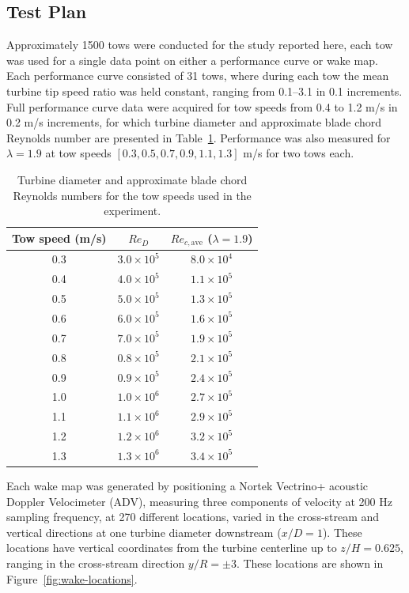 \documentclass[energies,article,accept,moreauthors,pdftex,12pt,a4paper]{mdpi}
\begin{document}
\subsection{Test Plan}

Approximately 1500 tows were conducted for the study reported here, each tow was
used for a single data point on either a performance curve or wake map. Each
performance curve consisted of 31 tows, where during each tow the mean turbine
tip speed ratio was held constant, ranging from 0.1--3.1 in 0.1 increments. Full
performance curve data were acquired for tow speeds from 0.4 to 1.2 m/s in 0.2
m/s increments, for which turbine diameter and approximate blade chord Reynolds
number are presented in Table~\ref{tab:Re}. Performance was also measured for
$\lambda=1.9$ at tow speeds $[0.3, 0.5, 0.7, 0.9, 1.1, 1.3]$ m/s for two tows
each.

\begin{table}
\centering
\begin{tabular}{ccc}
Tow speed (m/s) & $Re_D$ & $Re_{c,\mathrm{ave}}$ ($\lambda = 1.9$) \\
\hline
0.3 & $3.0 \times 10^5$ & $8.0 \times 10^4$ \\
0.4 & $4.0 \times 10^5$ & $1.1 \times 10^5$ \\
0.5 & $5.0 \times 10^5$ & $1.3 \times 10^5$ \\
0.6 & $6.0 \times 10^5$ & $1.6 \times 10^5$ \\
0.7 & $7.0 \times 10^5$ & $1.9 \times 10^5$ \\
0.8 & $0.8 \times 10^5$ & $2.1 \times 10^5$ \\
0.9 & $0.9 \times 10^5$ & $2.4 \times 10^5$ \\
1.0 & $1.0 \times 10^6$ & $2.7 \times 10^5$ \\
1.1 & $1.1 \times 10^6$ & $2.9 \times 10^5$ \\
1.2 & $1.2 \times 10^6$ & $3.2 \times 10^5$ \\
1.3 & $1.3 \times 10^6$ & $3.4 \times 10^5$ \\
\end{tabular}
\caption{Turbine diameter and approximate blade chord Reynolds numbers for the
tow speeds used in the experiment.}
\label{tab:Re}
\end{table}

Each wake map was generated by positioning a Nortek Vectrino+ acoustic Doppler
Velocimeter (ADV), measuring three components of velocity at 200 Hz sampling
frequency, at 270 different locations, varied in the cross-stream and vertical
directions at one turbine diameter downstream ($x/D=1$). These locations have
vertical coordinates from the turbine centerline up to $z/H=0.625$, ranging in
the cross-stream direction $y/R = \pm 3$. These locations are shown in
Figure~\ref{fig:wake-locations}.
\end{document}
